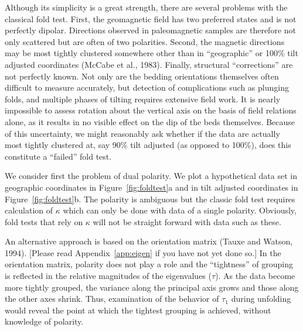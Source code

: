 Although its simplicity is a great strength, there are several problems with the
classical  fold test.
  First, the  geomagnetic field has two preferred states and is not perfectly dipolar.
Directions observed in paleomagnetic samples are therefore not only
scattered but are often of two polarities.
Second, the magnetic directions may be most tightly clustered somewhere other than in
``geographic'' or 100\% tilt adjusted coordinates (McCabe et al., 1983). \nocite{mccabe83}     Finally, structural
``corrections'' are not perfectly known.  Not only are the bedding
orientations themselves often difficult to measure
accurately, but detection of complications such as plunging folds, and
multiple phases of tilting requires
extensive field work.  It is nearly impossible to assess
rotation about the vertical axis on the basis of field relations alone,
as it results in no visible effect on the dip of the beds themselves.
Because of this uncertainty, we might reasonably ask whether if the data are actually
most tightly clustered at, say 90\% tilt adjusted (as opposed to 100\%), does this
constitute a ``failed'' fold test.
 
We consider first the problem of dual polarity.  We plot a hypothetical data 
set in geographic coordinates in Figure~\ref{fig:foldtest}a and in tilt adjusted coordinates in Figure~\ref{fig:foldtest}b.  The polarity is ambiguous but the classic fold test
requires calculation of $\kappa$ which can only be done with data of a single
polarity.  Obviously, fold tests that rely on $\kappa$ will not 
be straight forward with data such as these.

An alternative approach  is based on the orientation matrix 
(Tauxe and Watson, 1994).   \nocite{tauxe94} [Please read Appendix~\ref{app:eigen} if you have not yet done so.]
 In the
orientation matrix, polarity does not  play a role and the ``tightness'' of
grouping is reflected in the relative magnitudes of the eigenvalues ($\tau$).  
As the data become more tightly grouped, the variance along the principal
axis grows and those along the other axes shrink. Thus, examination of the
behavior of $\tau_1$ during unfolding would reveal the point at which
the tightest grouping is achieved, without knowledge of polarity.    



